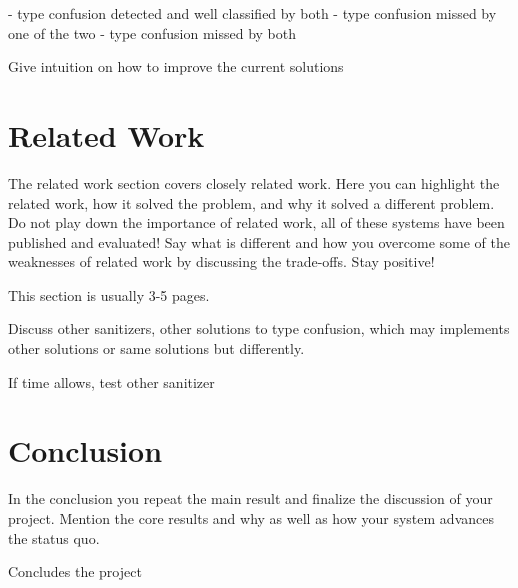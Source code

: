 \documentclass[a4paper,11pt,oneside]{report}
\begin{document}
- type confusion detected and well classified by both
- type confusion missed by one of the two
- type confusion missed by both

Give intuition on how to improve the current solutions

\chapter{Related Work}

The related work section covers closely related work. Here you can highlight
the related work, how it solved the problem, and why it solved a different
problem. Do not play down the importance of related work, all of these
systems have been published and evaluated! Say what is different and how
you overcome some of the weaknesses of related work by discussing the 
trade-offs. Stay positive!

This section is usually 3-5 pages.

Discuss other sanitizers, other solutions to type confusion,
which may implements other solutions or same solutions but differently.

If time allows, test other sanitizer




\chapter{Conclusion}

In the conclusion you repeat the main result and finalize the discussion of
your project. Mention the core results and why as well as how your system
advances the status quo.

Concludes the project 
\cleardoublepage
{}
{}
\printbibliography

%
%
\end{document}
